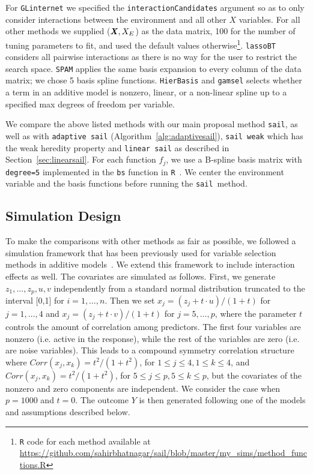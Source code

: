 \documentclass[12pt,letter]{article}\usepackage[]{graphicx}\usepackage[]{color}
\newcommand{\sail}{\texttt{sail}}
\newcommand{\bX}{\textbf{\emph{X}}}
\begin{document}
For \texttt{GLinternet} we specified the \texttt{interactionCandidates} argument so as to only consider interactions between the environment and all other $X$ variables. For all other methods we supplied ($\bX, X_E$) as the data matrix, 100 for the number of tuning parameters to fit, and used the default values otherwise\footnote[1]{\texttt{R} code for each method available at \url{https://github.com/sahirbhatnagar/sail/blob/master/my_sims/method_functions.R}}. \texttt{lassoBT} considers all pairwise interactions as there is no way for the user to restrict the search space. \texttt{SPAM} applies the same basis expansion to every column of the data matrix; we chose 5 basis spline functions. \texttt{HierBasis} and \texttt{gamsel} selects whether a term in an additive model is nonzero, linear, or a non-linear spline up to a specified max degrees of freedom per variable.

We compare the above listed methods with our main proposal method \texttt{sail}, as well as with \texttt{adaptive sail} (Algorithm~\ref{alg:adaptivesail}), \texttt{sail weak} which has the weak heredity property and \texttt{linear sail} as described in Section~\ref{sec:linearsail}. For each function $f_j$, we use a B-spline basis matrix with \texttt{degree=5} implemented in the \texttt{bs} function in \texttt{R}~\citep{cran}. We center the environment variable and the basis functions before running the \sail ~method.


\subsection{Simulation Design}
To make the comparisons with other methods as fair as possible, we followed a simulation framework that has been previously used for variable selection methods in additive models~\citep{lin2006component,huang2010variable}.
We extend this framework to include interaction effects as well.
The covariates are simulated as follows. First, we generate $z_1,\ldots, z_p, u,v$ independently from a standard normal distribution truncated to the interval [0,1] for $i=1,\ldots,n$. Then we set $x_j = (z_j + t\cdot u)/(1 + t)$ for $j = 1,\ldots, 4$ and $x_j = (z_j + t\cdot v)/(1 + t)$ for $j = 5,\ldots, p$, where the parameter $t$ controls the amount of correlation among predictors. The first four variables are nonzero (i.e. active in the response), while the rest of the variables are zero (i.e. are noise variables). This leads to a compound symmetry correlation structure where $Corr(x_j,x_k) = t^2/(1+t^2)$, for $1 \leq j \leq 4, 1 \leq k \leq 4$, and $Corr(x_j,x_k) = t^2/(1+t^2)$, for $5 \leq j \leq p, 5 \leq k \leq p$, but the covariates of the nonzero and zero components are independent. We consider the case when $p=1000$ and $t=0$. The outcome $Y$ is then generated following one of the models and assumptions described below.
\end{document}
